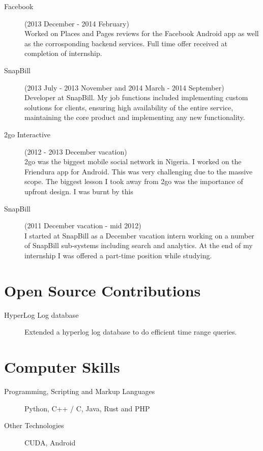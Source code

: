\documentclass[margin,line,a4paper]{resume}
\begin{document}
\begin{resume}
\begin{description}
                \item[Facebook] (2013 December - 2014 February) \\
                    Worked on Places and Pages reviews for the Facebook Android app as well as the corrosponding
                    backend services. Full time offer received at completion of internship.

                \item[SnapBill] (2013 July - 2013 November and 2014 March - 2014 September) \\
                    Developer at SnapBill. My job functions included implementing custom solutions for clients,
                    ensuring high availability of the entire service, maintaining the
                    core product and implementing any new functionality. 
                \item[2go Interactive] (2012 - 2013 December vacation) \\
                    2go was the biggest mobile social network in Nigeria. I worked on the Friendura app for Android. 
                    This was very challenging due to the massive scope. The biggest lesson I took away from 
                    2go was the importance of upfront design. I was burnt by this 


                \item[SnapBill] (2011 December vacation - mid 2012) \\
                    I started at SnapBill as a December vacation intern working on a number of SnapBill 
                    sub-systems including search and analytics. At the end of my internship I was offered a part-time position while studying. 
            \end{description}

        \section{\mysidestyle Open Source Contributions}
            \begin{description}
                \item[HyperLog Log database] Extended a hyperlog log database to do efficient time range queries.
            \end{description}

        \section{\mysidestyle Computer Skills}
            \begin{description}
                \item [Programming, Scripting and Markup Languages] Python, C++ / C, Java, Rust and PHP
                \item [Other Technologies] CUDA, Android
            \end{description}


\end{resume}
\end{document}
